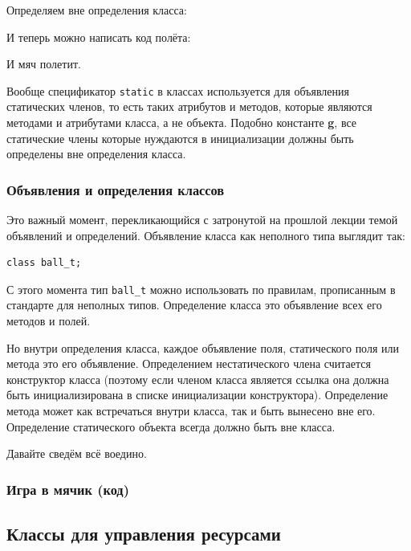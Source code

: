 \documentclass[a4paper,12pt,oneside]{article}
\begin{document}
Определяем вне определения класса:



И теперь можно написать код полёта:



И мяч полетит. 

Вообще спецификатор \lstinline!static! в классах используется для объявления статических членов, то есть таких атрибутов и методов, которые являются методами и атрибутами класса, а не объекта. Подобно константе \textbf{g}, все статические члены которые нуждаются в инициализации должны быть определены вне определения класса.

\subsubsection{Объявления и определения классов}

Это важный момент, перекликающийся с затронутой на прошлой лекции темой объявлений и определений. Объявление класса как неполного типа выглядит так:

\begin{lstlisting}
class ball_t;
\end{lstlisting}

С этого момента тип \lstinline!ball_t! можно использовать по правилам, прописанным в стандарте для неполных типов. Определение класса это объявление всех его методов и полей.

Но внутри определения класса, каждое объявление поля, статического поля или метода это его объявление. Определением нестатического члена считается конструктор класса (поэтому если членом класса является ссылка она должна быть инициализирована в списке инициализации конструктора). Определение метода может как встречаться внутри класса, так и быть вынесено вне его. Определение статического объекта всегда должно быть вне класса.

Давайте сведём всё воедино.

\subsubsection{Игра в мячик (код)}\label{BallGame}



\pagebreak
\subsection{Классы для управления ресурсами}
\end{document}
